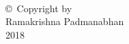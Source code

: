 
\thispagestyle{empty}
\hbox{\ }

\vfill
\renewcommand{\baselinestretch}{1}
\small\normalsize

\vspace{-.65in}

\begin{center}
\large{\copyright \hbox{ }Copyright by\\
Ramakrishna Padmanabhan %
\\
2018}
\end{center}

\vfill

\newpage

